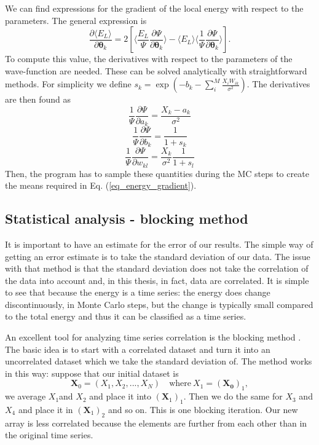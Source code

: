 We can find expressions for the gradient of the local energy with respect to the parameters. The general expression is
\begin{equation}
\frac{\partial\langle E_{L}\rangle}{\partial \boldsymbol{\theta}_k} = 2 \left[ \langle \frac{E_{L}}{\Psi}   \frac{\partial\Psi}{\partial\boldsymbol{\theta}_k} \rangle - \langle E_{L} \rangle \langle \frac{1}{\Psi}\frac{\partial\Psi}{\partial\boldsymbol{\theta}_k} \rangle  \right].
\label{eq_energy_gradient}
\end{equation}
To compute this value, the derivatives with respect to the parameters of the wave-function are needed. These can be solved analytically with straightforward methods. For simplicity we define $s_k = \exp(-b_k-\sum_i^M\frac{X_iW_{ik}}{\sigma^2})$. The derivatives are then found as
\begin{equation*}
\frac{1}{\Psi}\frac{\partial\Psi}{\partial a_k} = \frac{X_k-a_k}{\sigma^2}
\label{eq_grad_ak}
\end{equation*}
\begin{equation*}
\frac{1}{\Psi}\frac{\partial\Psi}{\partial b_k} = \frac{1}{1 + s_k}
\label{eq_grad_bk}
\end{equation*}
\begin{equation*}
\frac{1}{\Psi}\frac{\partial \Psi}{\partial w_{kl}} = \frac{X_k}{\sigma^2} \frac{1}{1+s_l}
\label{eq_grad_wk}
\end{equation*}
Then, the program has to sample these quantities during the MC steps to create the means required in Eq. (\ref{eq_energy_gradient}).

\subsection{Statistical analysis - blocking method}
It is important to have an estimate for the error of our results. The simple way of getting an error estimate is to take the standard deviation of our data. The issue with that method is that the standard deviation does not take the correlation of the data into account and, in this thesis, in fact, data are correlated. It is simple to see that because the energy is a time series: the energy does change discontinuously, in Monte Carlo steps, but the change is typically small compared to the total energy and thus it can be classified as a time series.

An excellent tool for analyzing time series correlation is the blocking method \cite{marius}. The basic idea is to start with a correlated dataset and turn it into an uncorrelated dataset which we take the standard deviation of. The method works in this way: suppose that our initial dataset is 
\begin{equation*}
\textbf{X}_0 = (X_1,X_2,...,X_N)\quad \text{where}\ X_1=(\mathbf{X_0})_1,
\end{equation*}
we average $X_1$and $X_2$ and place it into $(\textbf{X}_1)_1$. Then we do the same for $X_3$ and $X_4$ and place it in $(\textbf{X}_1)_2$ and so on. This is one blocking iteration. Our new array is less correlated because the elements are further from each other than in the original time series.

